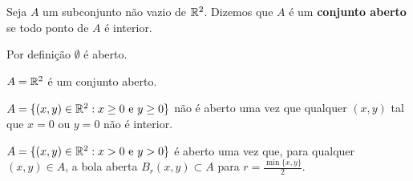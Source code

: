 \begin{definition}
    Seja \(A\) um subconjunto não vazio de \(\mathbb{R}^2\). Dizemos que \(A\) é  um \textbf{conjunto aberto} se todo ponto de \(A\) é interior.
\end{definition}

\begin{remark}
    Por definição \(\emptyset\) é aberto.
\end{remark}

\begin{example}
    \(A = \mathbb{R}^2\) é um conjunto aberto.
\end{example}

\begin{example}
    \(A = \{(x,y)\in\mathbb{R}^2 : x\geq 0 \text{ e } y\geq 0 \}\) não é aberto uma vez que qualquer \((x,y)\) tal que \(x=0\) ou \(y=0\) não é interior.
\end{example}

\begin{example}
    \(A = \{(x,y)\in\mathbb{R}^2 : x>0 \text{ e } y>0\}\) é aberto uma vez que, para qualquer \((x,y)\in A\), a bola aberta \(B_r(x,y)\subset A\) para \(r = \frac{\min\{x,y\}}{2}\).
\end{example}

